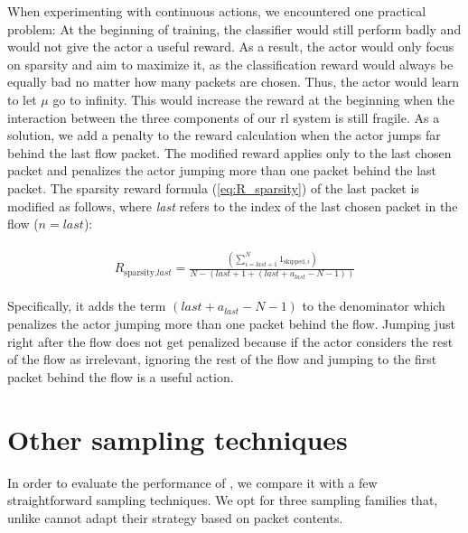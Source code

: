 \documentclass[conference]{IEEEtran}
\begin{document}
When experimenting with continuous actions, we encountered one practical problem: At the beginning of training, the classifier would still perform badly and would not give the actor a useful reward. As a result, the actor would only focus on sparsity and aim to maximize it, as the classification reward would always be equally bad no matter how many packets are chosen. Thus, the actor would learn to let $\mu$ go to infinity. This would increase the reward at the beginning when the interaction between the three components of our \gls{rl} system is still fragile. As a solution, we add a penalty to the reward calculation when the actor jumps far behind the last flow packet. The modified reward applies only to the last chosen packet and penalizes the actor jumping more than one packet behind the last packet. The sparsity reward formula (\autoref{eq:R_sparsity}) of the last packet is modified as follows, where \textit{last} refers to the index of the last chosen packet in the flow ($n=\textit{last}$):

\begin{align}
\begin{split}
R_{\text{sparsity},\textit{last}} = \frac{\left(\sum_{i=\textit{last}+1}^{N} 1_{\text{skipped},i}\right)}{N- (\textit{last}+1+\left(\textit{last}+a_{\textit{last}} - N - 1\right))}
\end{split}
\label{eq:R_sparsity_last}
\end{align}

Specifically, it adds the term $\left(\textit{last}+a_{\textit{last}} - N - 1\right)$ to the denominator which penalizes the actor jumping more than one packet behind the flow. Jumping just right after the flow does not get penalized because if the actor considers the rest of the flow as irrelevant, ignoring the rest of the flow and jumping to the first packet behind the flow is a useful action.

\section{Other sampling techniques}
\label{sec:other_sampling_techniques}
In order to evaluate the performance of \ours, we compare it with a few straightforward sampling techniques.
We opt for three sampling families that, unlike \ours{} cannot adapt their strategy based on packet contents. %
\end{document}
